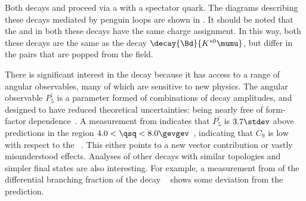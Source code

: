 
Both decays \btokpipimumu and \btophikmumu proceed via a \decay{\bquark}{\squark\mumu} \fcnc with a
spectator \uquark quark.
The diagrams describing these decays mediated by penguin loops are shown in
.
It should be noted that the \Bp and \Kp in both these decays have the same charge assignment.
In this way, both these decays are the same as the \fcnc decay $\decay{\Bd}{K^{*0}\mumu}$, but
differ in the \qqbar pairs that are popped from the \QCD field.

There is significant interest in the decay \btokstrmumu because it has access to a range of angular
observables, many of which are sensitive to new physics.
The angular observable $P_5^\prime$ is a parameter formed of combinations of \Kstarz decay
amplitudes, and designed to have reduced theoretical uncertainties: being nearly free of form-factor
dependence~\cite{LHCb-PAPER-2013-037}.
A measurement from \lhcb indicates that $P_5^\prime$ is $3.7\stdev$ above
predictions in the region $4.0<\qsq<8.0\gevgev$~\cite{LHCb-CONF-2015-002},
indicating that $C_9$ is low with respect to the \sm~\cite{Altmannshofer:2014rta}.
This either points to a new vector contribution or vastly misunderstood \QCD effects.
Analyses of other decays with similar topologies and simpler final states are also interesting.
For example, a measurement
from \lhcb of the differential branching fraction of
the decay \decay{\Bs}{\phi\mumu}~\cite{LHCb-PAPER-2015-023}  shows some deviation from the \sm
prediction.



